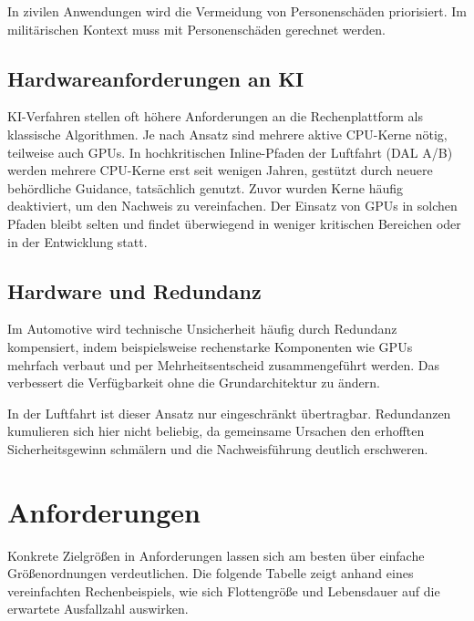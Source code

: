 In zivilen Anwendungen wird die Vermeidung von Personenschäden priorisiert. 
Im militärischen Kontext muss mit Personenschäden gerechnet werden.

\subsection*{Hardwareanforderungen an KI}

KI-Verfahren stellen oft höhere Anforderungen an die Rechenplattform als klassische Algorithmen. 
Je nach Ansatz sind mehrere aktive CPU-Kerne nötig, teilweise auch GPUs. 
In hochkritischen Inline-Pfaden der Luftfahrt (DAL A/B) werden mehrere CPU-Kerne erst seit wenigen Jahren, gestützt durch 
neuere behördliche Guidance, tatsächlich genutzt. Zuvor wurden Kerne häufig deaktiviert, um den Nachweis zu 
vereinfachen. Der Einsatz von GPUs in solchen Pfaden bleibt selten und findet überwiegend in 
weniger kritischen Bereichen oder in der Entwicklung statt.

\subsection*{Hardware und Redundanz}

Im Automotive wird technische Unsicherheit häufig durch Redundanz kompensiert, indem beispielsweise 
rechenstarke Komponenten wie GPUs mehrfach verbaut und per Mehrheitsentscheid zusammengeführt 
werden. Das verbessert die Verfügbarkeit ohne die Grundarchitektur zu ändern.

In der Luftfahrt ist dieser Ansatz nur eingeschränkt übertragbar. Redundanzen kumulieren 
sich hier nicht beliebig, da gemeinsame Ursachen den erhofften Sicherheitsgewinn schmälern 
und die Nachweisführung deutlich erschweren. 


\section{Anforderungen}
Konkrete Zielgrößen in Anforderungen lassen sich am besten über einfache Größenordnungen verdeutlichen. 
Die folgende Tabelle zeigt anhand eines vereinfachten Rechenbeispiels, wie sich Flottengröße 
und Lebensdauer auf die erwartete Ausfallzahl auswirken.


